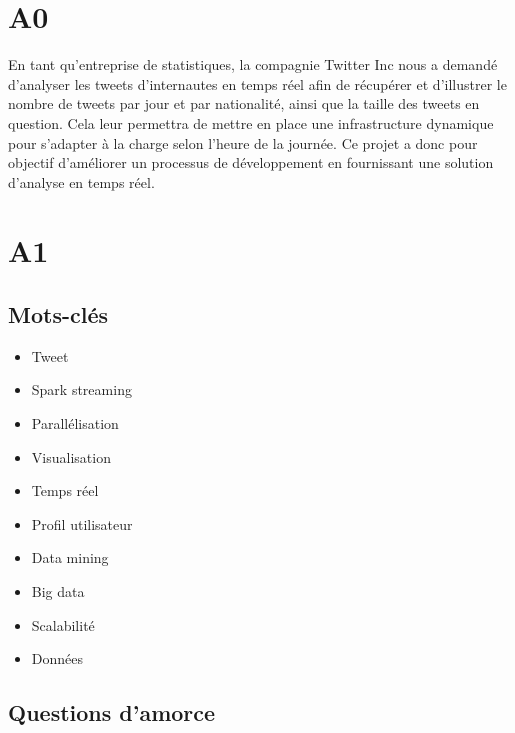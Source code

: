 \section{A0}
  En tant qu'entreprise de statistiques, la compagnie Twitter Inc nous a demandé d'analyser les tweets d'internautes en temps réel afin de récupérer et d'illustrer le nombre de tweets par jour et par nationalité, ainsi que la taille des tweets en question. Cela leur permettra de mettre en place une infrastructure dynamique pour s'adapter à la charge selon l'heure de la journée. Ce projet a donc pour objectif d'améliorer un processus de développement en fournissant une solution d'analyse en temps réel.

\section{A1}
  \subsection{Mots-clés}
  \label{sub:Mots-clés}

    \begin{itemize}
      \item Tweet
      \item Spark streaming
      \item Parallélisation
      \item Visualisation
      \item Temps réel
      \item Profil utilisateur
      \item Data mining
      \item Big data
      \item Scalabilité
      \item Données
    \end{itemize}

  \subsection{Questions d'amorce}
  \label{sub:Questions d'amorce}

